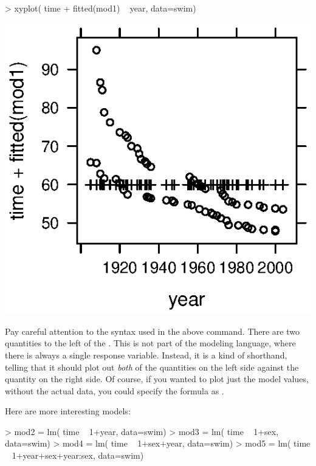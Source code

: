 \begin{Schunk}
\begin{Sinput}
> xyplot( time + fitted(mod1) ~ year, data=swim)
\end{Sinput}
\end{Schunk}
\includegraphics{Figures/language-fitted1}

Pay careful attention to the syntax used in the above command.  There
are two quantities to the left of the \code{~}.  This is not part of
the modeling language, where there is always a single response
variable.  Instead, it is a kind of shorthand, telling 
that it should plot out {\em both} of the quantities on the left side
against the quantity on the right side.  Of course, if you wanted to
plot just the model values, without the actual data, you could specify
the formula as .  

Here are more interesting models:
\begin{Schunk}
\begin{Sinput}
> mod2 = lm( time ~ 1+year, data=swim)
> mod3 = lm( time ~ 1+sex, data=swim)
> mod4 = lm( time ~ 1+sex+year, data=swim)
> mod5 = lm( time ~ 1+year+sex+year:sex, data=swim)
\end{Sinput}
\end{Schunk}


